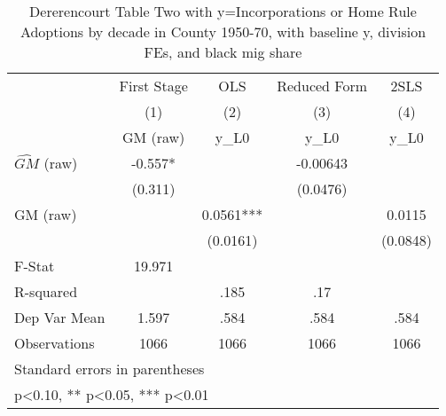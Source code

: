\begin{table}[htbp]\centering
\def\sym#1{\ifmmode^{#1}\else\(^{#1}\)\fi}
\caption{Dererencourt Table Two with y=Incorporations or Home Rule Adoptions by decade in County 1950-70, with baseline y, division FEs, and black mig share}
\begin{tabular}{l*{4}{c}}
\toprule
                    & First Stage   &         OLS   &Reduced Form   &        2SLS   \\
                    &\multicolumn{1}{c}{(1)}&\multicolumn{1}{c}{(2)}&\multicolumn{1}{c}{(3)}&\multicolumn{1}{c}{(4)}\\
                    &\multicolumn{1}{c}{GM  (raw)}&\multicolumn{1}{c}{y\_L0}&\multicolumn{1}{c}{y\_L0}&\multicolumn{1}{c}{y\_L0}\\
\midrule
$\hat{GM}$ (raw)    &      -0.557*  &               &    -0.00643   &               \\
                    &     (0.311)   &               &    (0.0476)   &               \\
\addlinespace
GM  (raw)           &               &      0.0561***&               &      0.0115   \\
                    &               &    (0.0161)   &               &    (0.0848)   \\
\midrule
F-Stat              &      19.971   &               &               &               \\
R-squared           &               &        .185   &         .17   &               \\
Dep Var Mean        &       1.597   &        .584   &        .584   &        .584   \\
Observations        &        1066   &        1066   &        1066   &        1066   \\
\bottomrule
\multicolumn{5}{l}{\footnotesize Standard errors in parentheses}\\
\multicolumn{5}{l}{\footnotesize * p<0.10, ** p<0.05, *** p<0.01}\\
\end{tabular}
\end{table}
